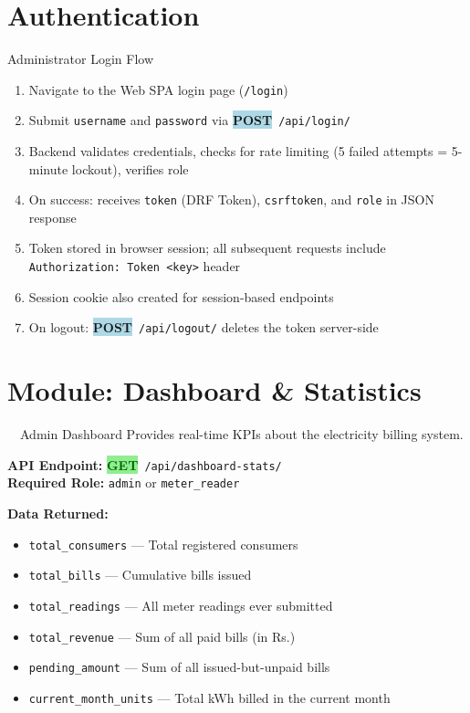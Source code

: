 \documentclass[12pt, a4paper]{report}
\newcommand{\httpget}{\colorbox{lightGreen}{\textcolor{darkGreen}{\textbf{\small GET}}}}
\newcommand{\httppost}{\colorbox{lightBlue}{\textcolor{deepBlue}{\textbf{\small POST}}}}
\newenvironment{featurelist}{%
    \begin{itemize}[leftmargin=1.5em, itemsep=2pt, parsep=0pt]
}{%
    \end{itemize}
}
\begin{document}
\section{Authentication}

\begin{actorbox}{Administrator Login Flow}
\begin{enumerate}[leftmargin=1.5em]
    \item Navigate to the Web SPA login page (\texttt{/login})
    \item Submit \texttt{username} and \texttt{password} via \httppost\ \texttt{/api/login/}
    \item Backend validates credentials, checks for rate limiting (5 failed attempts = 5-minute lockout), verifies role
    \item On success: receives \texttt{token} (DRF Token), \texttt{csrftoken}, and \texttt{role} in JSON response
    \item Token stored in browser session; all subsequent requests include \texttt{Authorization: Token <key>} header
    \item Session cookie also created for session-based endpoints
    \item On logout: \httppost\ \texttt{/api/logout/} deletes the token server-side
\end{enumerate}
\end{actorbox}

\section{Module: Dashboard \& Statistics}

\begin{modulebox}{\faChartBar\ \ Admin Dashboard}
Provides real-time KPIs about the electricity billing system.
\end{modulebox}

\textbf{API Endpoint:} \httpget\ \texttt{/api/dashboard-stats/}\\
\textbf{Required Role:} \texttt{admin} or \texttt{meter\_reader}

\textbf{Data Returned:}
\begin{featurelist}
    \item \texttt{total\_consumers} — Total registered consumers
    \item \texttt{total\_bills} — Cumulative bills issued
    \item \texttt{total\_readings} — All meter readings ever submitted
    \item \texttt{total\_revenue} — Sum of all paid bills (in Rs.)
    \item \texttt{pending\_amount} — Sum of all issued-but-unpaid bills
    \item \texttt{current\_month\_units} — Total kWh billed in the current month
\end{featurelist}
\end{document}
